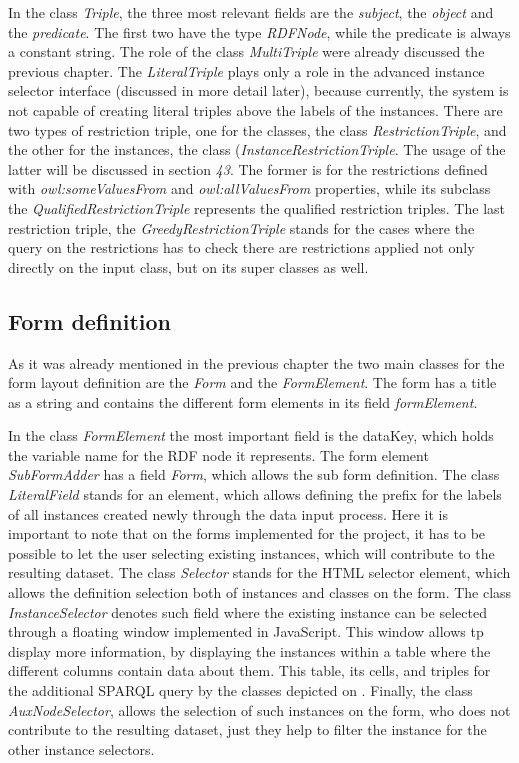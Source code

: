In the class \textit{Triple}, the three most relevant fields are the \textit{subject}, the \textit{object} and the \textit{predicate}. The first two have the type \textit{RDFNode}, while the predicate is always a constant string. The role of the class \textit{MultiTriple} were already discussed the previous chapter. The \textit{LiteralTriple} plays only a role in the advanced instance selector interface (discussed in more detail later), because currently, the system is not capable of creating literal triples above the labels of the instances. There are two types of restriction triple, one for the classes, the class \textit{RestrictionTriple}, and the other for the instances, the class (\textit{InstanceRestrictionTriple}. The usage of the latter will be discussed in section \textit{43}. The former is for the restrictions defined with \textit{owl:someValuesFrom} and \textit{owl:allValuesFrom} properties, while its subclass the \textit{QualifiedRestrictionTriple} represents the qualified restriction triples. The last restriction triple, the \textit{GreedyRestrictionTriple} stands for the cases where the query on the restrictions has to check there are restrictions applied not only directly on the input class, but on its super classes as well.

\subsection{Form definition}

As it was already mentioned in the previous chapter the two main classes for the form layout definition are the \textit{Form} and the \textit{FormElement}. The form has a title as a string and contains the different form elements in its field \textit{formElement}. 


In the class \textit{FormElement} the most important field is the dataKey, which holds the variable name for the RDF node it represents. The form element \textit{SubFormAdder} has a field \textit{Form}, which allows the sub form definition. The class \textit{LiteralField} stands for an element, which allows defining the prefix for the labels of all instances created newly through the data input process. Here it is important to note that on the forms implemented for the project, it has to be possible to let the user selecting existing instances, which will contribute to the resulting dataset. The class \textit{Selector} stands for the HTML selector element, which allows the definition selection both of instances and classes on the form. The class \textit{InstanceSelector} denotes such field where the existing instance can be selected through a floating window implemented in JavaScript. This window allows tp display more information, by displaying the instances within a table where the different columns contain data about them. This table, its cells, and triples for the additional SPARQL query by the classes depicted on . Finally, the class \textit{AuxNodeSelector}, allows the selection of such instances on the form, who does not contribute to the resulting dataset, just they help to filter the instance for the other instance selectors.

